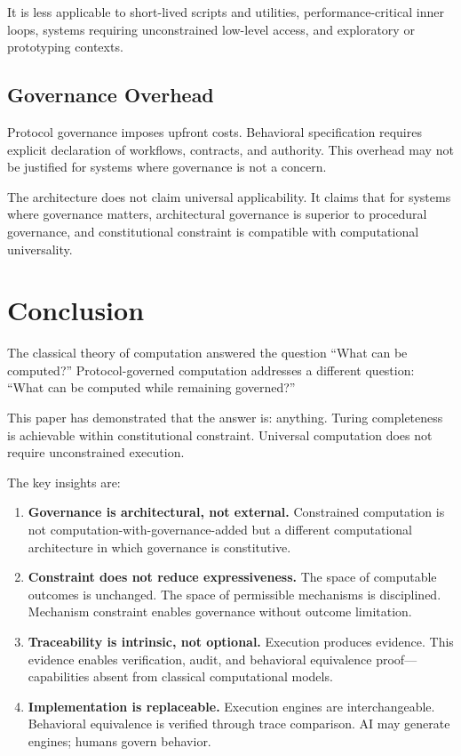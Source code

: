 \documentclass[11pt,a4paper]{article}
\begin{document}
It is less applicable to short-lived scripts and utilities, performance-critical inner loops, systems requiring unconstrained low-level access, and exploratory or prototyping contexts.

\subsection{Governance Overhead}

Protocol governance imposes upfront costs. Behavioral specification requires explicit declaration of workflows, contracts, and authority. This overhead may not be justified for systems where governance is not a concern.

The architecture does not claim universal applicability. It claims that for systems where governance matters, architectural governance is superior to procedural governance, and constitutional constraint is compatible with computational universality.



\section{Conclusion}
\label{sec:conclusion}

The classical theory of computation answered the question ``What can be computed?'' Protocol-governed computation addresses a different question: ``What can be computed while remaining governed?''

This paper has demonstrated that the answer is: anything. Turing completeness is achievable within constitutional constraint. Universal computation does not require unconstrained execution.

The key insights are:

\begin{enumerate}[nosep]
    \item \textbf{Governance is architectural, not external.} Constrained computation is not computation-with-governance-added but a different computational architecture in which governance is constitutive.

    \item \textbf{Constraint does not reduce expressiveness.} The space of computable outcomes is unchanged. The space of permissible mechanisms is disciplined. Mechanism constraint enables governance without outcome limitation.

    \item \textbf{Traceability is intrinsic, not optional.} Execution produces evidence. This evidence enables verification, audit, and behavioral equivalence proof---capabilities absent from classical computational models.

    \item \textbf{Implementation is replaceable.} Execution engines are interchangeable. Behavioral equivalence is verified through trace comparison. AI may generate engines; humans govern behavior.
\end{enumerate}
\end{document}
